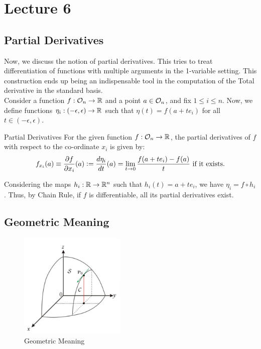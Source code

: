 \documentclass[../Analysis-3.tex]{subfiles}
\begin{document}
\chapter*{Lecture 6} %
\setcounter{chapter}{6} %
\setcounter{section}{0}
\setcounter{equation}{0}
\setcounter{figure}{0}


\section{Partial Derivatives}

Now, we discuss the notion of partial derivatives. This tries to treat differentiation of functions with multiple arguments in the 1-variable setting. This construction ends up being an indispensable tool in the computation of the Total derivative in the standard basis.\\[0.2 cm]

Consider a function $f:\mathcal{O}_{n} \rightarrow\mathbb{R}$ and a point $a \in \mathcal{O}_{n}$, and fix $1 \leq i \leq n$. Now, we define functions $\eta_i : (-\epsilon, \epsilon) \rightarrow \mathbb{R}$ such that $\eta(t) = f(a + te_i)$ for all $t \in (-\epsilon, \epsilon)$.

\begin{Def}{Partial Derivatives}{}
  For the given function $f:\mathcal{O}_{n} \rightarrow\mathbb{R}$, the partial derivatives of $f$ with respect to the co-ordinate $x_i$ is given by:
  \[
    f_{x_i}(a) \equiv \pdv{f}{x_i}\/(a) \mathrel{\mathop:}=  \frac{d\eta_i}{dt}(a) = \lim_{t \to 0} \frac{f(a+te_i) - f(a)}{t} \text{ if it exists.}
  \]
\end{Def}

Considering the maps $h_i : \mathbb{R} \to \mathbb{R}^n$ such that $h_i(t) = a + te_i$, we have $\eta_i = f \circ h_i$. Thus, by Chain Rule, if $f$ is differentiable, all its partial derivatives exist.

\section{Geometric Meaning}

\begin{figure}
  \centering
  \includegraphics[width=0.45\textwidth]{figures/lec6.1.png}
  \caption{Geometric Meaning}
  \label{fig1:6}
\end{figure}
\end{document}
